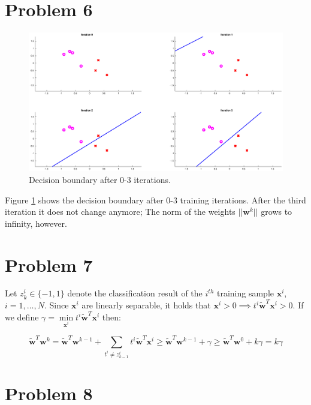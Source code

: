 \documentclass[12pt]{article}
\begin{document}
\section*{Problem 6}

\begin{figure}[!ht]
 \includegraphics[width=\textwidth]{perceptron6}
 \caption{Decision boundary after 0-3 iterations.}
 \label{fig:prob6}
\end{figure}

Figure \ref{fig:prob6} shows the decision boundary after 0-3 training iterations. After the third iteration it does not change anymore; The norm of the weights $||\mathbf{w}^k||$ grows to infinity, however.


\section*{Problem 7}

Let $z_k^i \in \{-1, 1\}$ denote the classification result of the $i^{th}$ training sample $\mathbf{x}^i$, $i = 1, \ldots, N$. Since $\mathbf{x}^i$ are linearly separable, it holds that $ \mathbf{x}^i > 0 \implies t^i \widetilde{\mathbf{w}}^T \mathbf{x}^i > 0$. If we define $\gamma = \min\limits_{\mathbf{x}^i} t^i \widetilde{\mathbf{w}}^T \mathbf{x}^i$ then:

\begin{equation}
 \widetilde{\mathbf{w}}^T \mathbf{w}^k = \widetilde{\mathbf{w}}^T \mathbf{w}^{k-1} + \sum_{t^i \neq z_{k-1}^i} t^i \widetilde{\mathbf{w}}^T \mathbf{x}^i \geq \widetilde{\mathbf{w}}^T \mathbf{w}^{k-1} + \gamma \geq \widetilde{\mathbf{w}}^T \mathbf{w}^{0} + k \gamma = k \gamma
\end{equation}


\section*{Problem 8}
\end{document}
